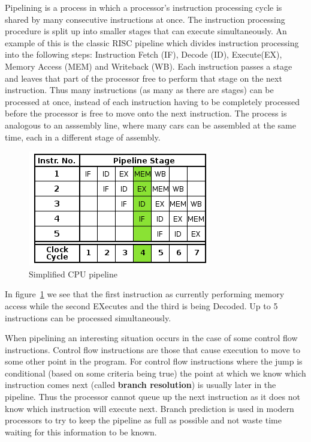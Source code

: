 \documentclass[english,a4paper]{report}
\begin{document}
Pipelining is a process in which a processor's instruction processing
cycle is shared by many consecutive instructions at once. The
instruction processing procedure is split up into smaller stages that
can execute simultaneously. An example of this is the classic RISC
pipeline which divides instruction processing into the following
steps: Instruction Fetch (IF), Decode (ID), Execute(EX), Memory Access
(MEM) and Writeback (WB). Each instruction passes a stage and leaves
that part of the processor free to perform that stage on the next
instruction. Thus many instructions (as many as there are stages) can
be processed at once, instead of each instruction having to be
completely processed before the processor is free to move onto the
next instruction. The process is analogous to an asssembly line, where
many cars can be assembled at the same time, each in a different stage
of assembly.

\begin{figure}[tph]
  \centering
  \includegraphics[scale=0.5]{pipeline}
  \caption{Simplified CPU pipeline}
  \label{fig:pipeline}
\end{figure}

In figure~\ref{fig:pipeline} we see that the first instruction as
currently performing memory access while the second EXecutes and the
third is being Decoded. Up to 5 instructions can be processed
simultaneously.

When pipelining an interesting situation occurs in the case of some
control flow instructions. Control flow instructions are those that
cause execution to move to some other point in the program. For
control flow instructions where the jump is conditional (based on some
criteria being true) the point at which we know which instruction
comes next (called \textbf{branch resolution}) is usually later in the
pipeline. Thus the processor cannot queue up the next instruction as
it does not know which instruction will execute next. Branch
prediction is used in modern processors to try to keep the pipeline as
full as possible and not waste time waiting for this information to be
known.
\end{document}
